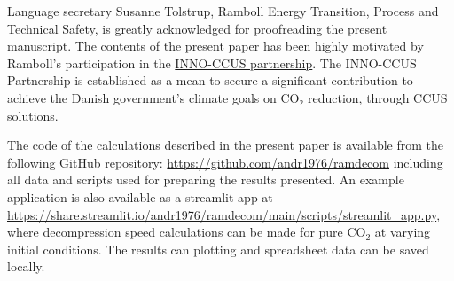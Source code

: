 \documentclass[a4paper, 10pt, twocolumn, twoside]{scrartcl}
\begin{document}
\Acknowledgement
Language secretary Susanne Tolstrup, Ramboll Energy Transition, Process and Technical Safety, is greatly acknowledged for proofreading the present manuscript.  The contents of the present paper has been highly motivated by Ramboll's participation in the \href{https://inno-ccus.dk/}{INNO-CCUS partnership}.
The INNO-CCUS Partnership is established as a mean to secure a significant contribution to achieve the Danish government’s climate goals on CO₂ reduction, through CCUS solutions.





\Appendix
The code of the calculations described in the present paper is available from the following GitHub repository: \url{https://github.com/andr1976/ramdecom} including all data and scripts used for preparing the results presented. An example application is also available as a streamlit app at \url{https://share.streamlit.io/andr1976/ramdecom/main/scripts/streamlit_app.py}, where decompression speed calculations can be made for pure CO$_2$ at varying initial conditions. The results can plotting and spreadsheet data can be saved locally.
\end{document}
